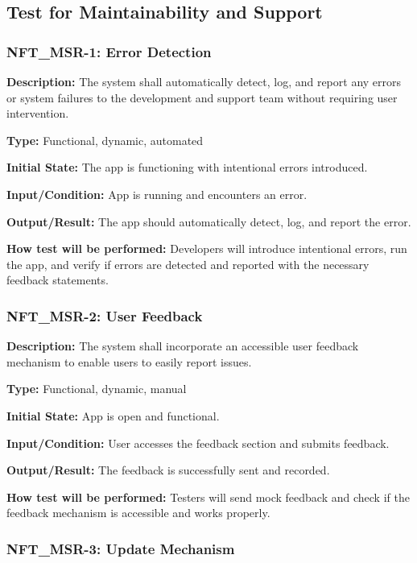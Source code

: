 \documentclass[12pt, titlepage]{article}
\begin{document}
\subsection{Test for Maintainability and Support}


\subsubsection*{\textbf{NFT\_MSR-1:} Error Detection}

\textbf{Description: }The system shall automatically detect, log, and report any errors or system failures to the development and support team without requiring user intervention. 

\textbf{Type: }Functional, dynamic, automated

\textbf{Initial State: }The app is functioning with intentional errors introduced.

\textbf{Input/Condition:} App is running and encounters an error.

\textbf{Output/Result: }The app should automatically detect, log, and report the error.

\textbf{How test will be performed:} Developers will introduce intentional errors, run the app, and verify if errors are detected and reported with the necessary feedback statements. 


\subsubsection*{\textbf{NFT\_MSR-2: User Feedback}
}

\textbf{Description: }The system shall incorporate an accessible user feedback mechanism to enable users to easily report issues.

\textbf{Type:} Functional, dynamic, manual

\textbf{Initial State: }App is open and functional.

\textbf{Input/Condition:} User accesses the feedback section and submits feedback.

\textbf{Output/Result:} The feedback is successfully sent and recorded.

\textbf{How test will be performed: }Testers will send mock feedback and check if the feedback mechanism is accessible and works properly.


\subsubsection*{\textbf{NFT\_MSR-3: Update Mechanism}
}
\end{document}
